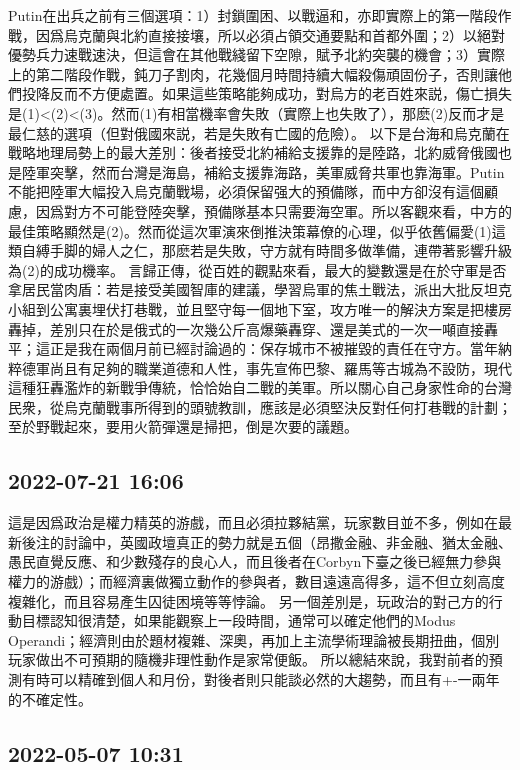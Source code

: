 \documentclass[twocolumn]{ctexart}
\begin{document}
Putin在出兵之前有三個選項：1）封鎖圍困、以戰逼和，亦即實際上的第一階段作戰，因爲烏克蘭與北約直接接壤，所以必須占領交通要點和首都外圍；2）以絕對優勢兵力速戰速決，但這會在其他戰綫留下空隙，賦予北約突襲的機會；3）實際上的第二階段作戰，鈍刀子割肉，花幾個月時間持續大幅殺傷頑固份子，否則讓他們投降反而不方便處置。如果這些策略能夠成功，對烏方的老百姓來説，傷亡損失是(1)<(2)<(3)。然而(1)有相當機率會失敗（實際上也失敗了），那麽(2)反而才是最仁慈的選項（但對俄國來説，若是失敗有亡國的危險）。
以下是台海和烏克蘭在戰略地理局勢上的最大差別：後者接受北約補給支援靠的是陸路，北約威脅俄國也是陸軍突擊，然而台灣是海島，補給支援靠海路，美軍威脅共軍也靠海軍。Putin不能把陸軍大幅投入烏克蘭戰場，必須保留强大的預備隊，而中方卻沒有這個顧慮，因爲對方不可能登陸突擊，預備隊基本只需要海空軍。所以客觀來看，中方的最佳策略顯然是(2)。然而從這次軍演來倒推決策幕僚的心理，似乎依舊偏愛(1)這類自縛手脚的婦人之仁，那麽若是失敗，守方就有時間多做準備，連帶著影響升級為(2)的成功機率。
言歸正傳，從百姓的觀點來看，最大的變數還是在於守軍是否拿居民當肉盾：若是接受美國智庫的建議，學習烏軍的焦土戰法，派出大批反坦克小組到公寓裏埋伏打巷戰，並且堅守每一個地下室，攻方唯一的解決方案是把樓房轟掉，差別只在於是俄式的一次幾公斤高爆藥轟穿、還是美式的一次一噸直接轟平；這正是我在兩個月前已經討論過的：保存城市不被摧毀的責任在守方。當年納粹德軍尚且有足夠的職業道德和人性，事先宣佈巴黎、羅馬等古城為不設防，現代這種狂轟濫炸的新戰爭傳統，恰恰始自二戰的美軍。所以關心自己身家性命的台灣民衆，從烏克蘭戰事所得到的頭號教訓，應該是必須堅決反對任何打巷戰的計劃；至於野戰起來，要用火箭彈還是掃把，倒是次要的議題。
\subsection*{2022-07-21 16:06}

這是因爲政治是權力精英的游戲，而且必須拉夥結黨，玩家數目並不多，例如在最新後注的討論中，英國政壇真正的勢力就是五個（昂撒金融、非金融、猶太金融、愚民直覺反應、和少數殘存的良心人，而且後者在Corbyn下臺之後已經無力參與權力的游戲）；而經濟裏做獨立動作的參與者，數目遠遠高得多，這不但立刻高度複雜化，而且容易產生囚徒困境等等悖論。
另一個差別是，玩政治的對己方的行動目標認知很清楚，如果能觀察上一段時間，通常可以確定他們的Modus Operandi；經濟則由於題材複雜、深奧，再加上主流學術理論被長期扭曲，個別玩家做出不可預期的隨機非理性動作是家常便飯。
所以總結來說，我對前者的預測有時可以精確到個人和月份，對後者則只能談必然的大趨勢，而且有+-一兩年的不確定性。
\subsection*{2022-05-07 10:31}
\end{document}
